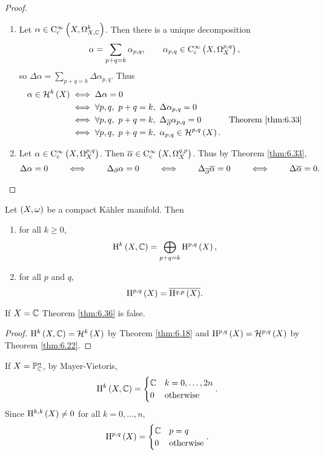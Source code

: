 \begin{proof}
\hfill
\begin{enumerate}
\item Let $ \alpha \in \COCc{X}{k} $. Then there is a unique decomposition
$$ \alpha = \sum_{p + q = k} \alpha_{p, q}, \qquad \alpha_{p, q} \in \COc{X}{p, q}, $$
so $ \Delta\alpha = \sum_{p + q = k} \Delta\alpha_{p, q} $. Thus
\begin{align*}
\alpha \in \HHH^k\br{X}
& \iff \Delta\alpha = 0 \\
& \iff \forall p, q, \ p + q = k, \ \Delta\alpha_{p, q} = 0 \\
& \iff \forall p, q, \ p + q = k, \ \Delta_{\dab}\alpha_{p, q} = 0 & \text{Theorem \ref{thm:6.33}} \\
& \iff \forall p, q, \ p + q = k, \ \alpha_{p, q} \in \HHH^{p, q}\br{X}.
\end{align*}
\item Let $ \alpha \in \COc{X}{p, q} $. Then $ \overline{\alpha} \in \COc{X}{q, p} $. Thus by Theorem \ref{thm:6.33},
$$ \Delta\alpha = 0 \qquad \iff \qquad \Delta_\partial\alpha = 0 \qquad \iff \qquad \Delta_{\overline{\partial}}\overline{\alpha} = 0 \qquad \iff \qquad \Delta\overline{\alpha} = 0. $$
\end{enumerate}
\end{proof}

\pagebreak

\begin{theorem}
\label{thm:6.36}
Let $ \br{X, \omega} $ be a compact K\"ahler manifold. Then
\begin{enumerate}
\item for all $ k \ge 0 $,
$$ \H^k\br{X, \CC} = \bigoplus_{p + q = k} \H^{p, q}\br{X}, $$
\item for all $ p $ and $ q $,
$$ \H^{p, q}\br{X} = \overline{\H^{q, p}\br{X}}. $$
\end{enumerate}
\end{theorem}

\begin{exercise*}
If $ X = \mathbb{C} $ Theorem \ref{thm:6.36} is false.
\end{exercise*}

\begin{proof}
$ \H^k\br{X, \CC} = \HHH^k\br{X} $ by Theorem \ref{thm:6.18} and $ \H^{p, q}\br{X} = \HHH^{p, q}\br{X} $ by Theorem \ref{thm:6.22}.
\end{proof}

\begin{example}
If $ X = \mathbb{P}_{\mathbb{C}}^n $, by Mayer-Vietoris,
$$ \H^k\br{X, \CC} =
\begin{cases}
\CC & k = 0, \dots, 2n \\
0 & \text{otherwise}
\end{cases}.
$$
Since $ \H^{k, k}\br{X} \ne 0 $ for all $ k = 0, \dots, n $,
$$ \H^{p, q}\br{X} =
\begin{cases}
\CC & p = q \\
0 & \text{otherwise}
\end{cases}.
$$
\end{example}

